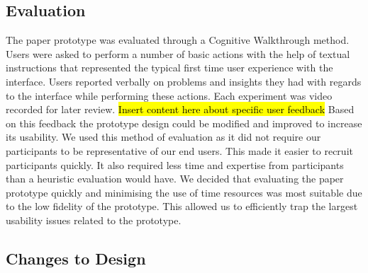 \documentclass{sig-alternate-05-2015}
\begin{document}
\subsection{Evaluation}
The paper prototype was evaluated through a Cognitive Walkthrough method\cite{Bowman2002}. Users were asked to perform a number of basic actions with the help of textual instructions that represented the typical first time user experience with the interface. Users reported verbally on problems and insights they had with regards to the interface while performing these actions. Each experiment was video recorded for later review.
\newline\newline
\hl{Insert content here about specific user feedback}
\newline\newline
Based on this feedback the prototype design could be modified and improved to increase its usability.
\newline\newline
We used this method of evaluation as it did not require our participants to be representative of our end users\cite{Bowman2002}. This made it easier to recruit participants quickly. It also required less time and expertise from participants than a heuristic evaluation would have. We decided that evaluating the paper prototype quickly and minimising the use of time resources was most suitable due to the low fidelity of the prototype. This allowed us to efficiently trap the largest usability issues related to the prototype.

\subsection{Changes to Design}
\end{document}
